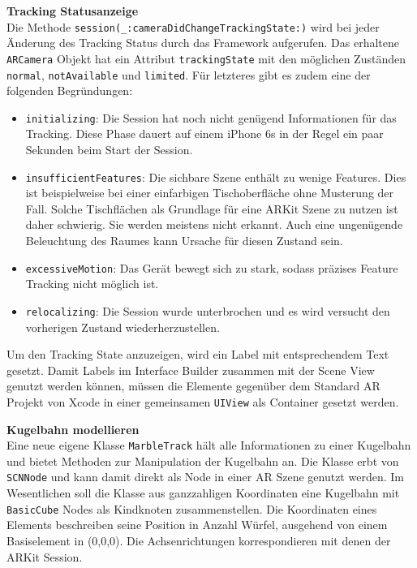 \begin{description}
	\textbf{Tracking Statusanzeige} \\ %
	Die Methode \texttt{session(\_:cameraDidChangeTrackingState:)} wird bei jeder Änderung des Tracking Status durch das Framework aufgerufen. Das erhaltene \texttt{ARCamera} Objekt hat ein Attribut \texttt{trackingState} mit den möglichen Zuständen \texttt{normal}, \texttt{notAvailable} und \texttt{limited}. Für letzteres gibt es zudem eine der folgenden Begründungen:
	\begin{itemize}
		\item \texttt{initializing}: Die Session hat noch nicht genügend Informationen für das Tracking. Diese Phase dauert auf einem iPhone 6s in der Regel ein paar Sekunden beim Start der Session.
		\item \texttt{insufficientFeatures}: Die sichbare Szene enthält zu wenige Features. Dies ist beispielweise bei einer einfarbigen Tischoberfläche ohne Musterung der Fall. Solche Tischflächen als Grundlage für eine ARKit Szene zu nutzen ist daher schwierig. Sie werden meistens nicht erkannt. Auch eine ungenügende Beleuchtung des Raumes kann Ursache für diesen Zustand sein.
		\item \texttt{excessiveMotion}: Das Gerät bewegt sich zu stark, sodass präzises Feature Tracking nicht möglich ist.
		\item \texttt{relocalizing}: Die Session wurde unterbrochen und es wird versucht den vorherigen Zustand wiederherzustellen.
	\end{itemize}
	Um den Tracking State anzuzeigen, wird ein Label mit entsprechendem Text gesetzt. Damit Labels im Interface Builder zusammen mit der Scene View genutzt werden können, müssen die Elemente gegenüber dem Standard AR Projekt von Xcode in einer gemeinsamen \texttt{UIView} als Container gesetzt werden.

	\textbf{Kugelbahn modellieren}\\
	Eine neue eigene Klasse \texttt{MarbleTrack} hält alle Informationen zu einer Kugelbahn und bietet Methoden zur Manipulation der Kugelbahn an. Die Klasse erbt von \texttt{SCNNode} und kann damit direkt als Node in einer AR Szene genutzt werden. Im Wesentlichen soll die Klasse aus ganzzahligen Koordinaten eine Kugelbahn mit \texttt{BasicCube} Nodes als Kindknoten zusammenstellen. Die Koordinaten eines Elements beschreiben seine Position in Anzahl Würfel, ausgehend von einem Basiselement in (0,0,0). Die Achsenrichtungen korrespondieren mit denen der ARKit Session.


\end{description}
